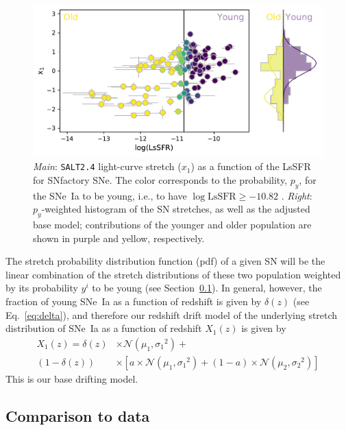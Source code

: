 \documentclass[]{aa}
\begin{document}
\begin{figure}
    \centering
    \includegraphics[width=0.8\linewidth]{Article_figures/model_base_hist.pdf}
    \caption{\textit{Main}: \textsc{\texttt{SALT2.4}} light-curve stretch ($x_1$)
        as a function of the LsSFR for
        SNfactory SNe. The color corresponds to the
        probability, $p_y$, for the SNe~Ia to be young, i.e., to have
        $\log\mathrm{LsSFR} \geq -10.82$ \citep[see][]{rigault2020}.
        \textit{Right}: $p_y$-weighted histogram of the SN stretches, as well as
        the adjusted base model; contributions of the younger and older population
        are shown in purple and yellow, respectively.}
    \label{fig:stretchlssfr}
\end{figure}

The stretch probability distribution function (pdf) of a given SN will be the
linear combination of the stretch distributions of these two population weighted
by its probability $y^i$ to be young (see Section~\ref{sec:basemodelapplied}).
In general, however, the fraction of young SNe~Ia as a function of redshift is
given by $\delta(z)$ (see Eq.~\ref{eq:delta}), and therefore our redshift drift
model of the underlying stretch distribution of SNe~Ia as a function of redshift
$X_1(z)$ is given by
\begin{align}\label{eq:stretchz}
    X_1(z) = \delta(z)&\times \mathcal{N}(\mu_1,\sigma_1{}^2) + \nonumber \\
    (1-\delta(z))&\times \left[ a\times\mathcal{N}(\mu_1,\sigma_1{}^2) +
    (1-a)\times\mathcal{N}(\mu_2,\sigma_2{}^2) \right]
\end{align}
This is our base drifting model.

\subsection{Comparison to data}\label{sec:basemodelapplied}
\end{document}
